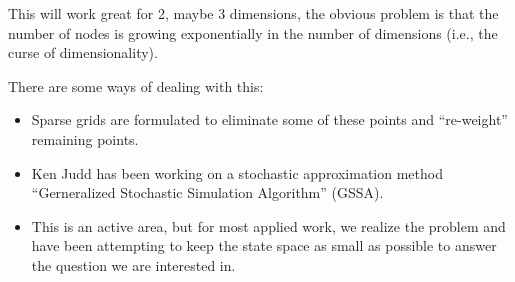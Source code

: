 \documentclass[twoside]{article}
\begin{document}
This will work great for 2, maybe 3 dimensions, the obvious problem is that the number of nodes is growing exponentially in the number of dimensions (i.e., the curse of dimensionality). 
 
 There are some ways of dealing with this:
 \begin{itemize}
 \item Sparse grids are formulated to eliminate some of these points and ``re-weight'' remaining points. 
 \item Ken Judd has been working on a stochastic approximation method ``Gerneralized Stochastic Simulation Algorithm'' (GSSA).
 \item This is an active area, but for most applied work, we realize the problem and have been attempting to keep the state space as 
 small as possible to answer the question we are interested in. 
 \end{itemize}
 
\end{document}

